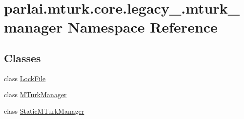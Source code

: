\hypertarget{namespaceparlai_1_1mturk_1_1core_1_1legacy__2018_1_1mturk__manager}{}\section{parlai.\+mturk.\+core.\+legacy\+\_.\+mturk\+\_\+manager Namespace Reference}
\label{namespaceparlai_1_1mturk_1_1core_1_1legacy__2018_1_1mturk__manager}
\subsection*{Classes}
\begin{DoxyCompactItemize}
\item 
class \hyperlink{classparlai_1_1mturk_1_1core_1_1legacy__2018_1_1mturk__manager_1_1LockFile}{Lock\+File}
\item 
class \hyperlink{classparlai_1_1mturk_1_1core_1_1legacy__2018_1_1mturk__manager_1_1MTurkManager}{M\+Turk\+Manager}
\item 
class \hyperlink{classparlai_1_1mturk_1_1core_1_1legacy__2018_1_1mturk__manager_1_1StaticMTurkManager}{Static\+M\+Turk\+Manager}
\end{DoxyCompactItemize}
